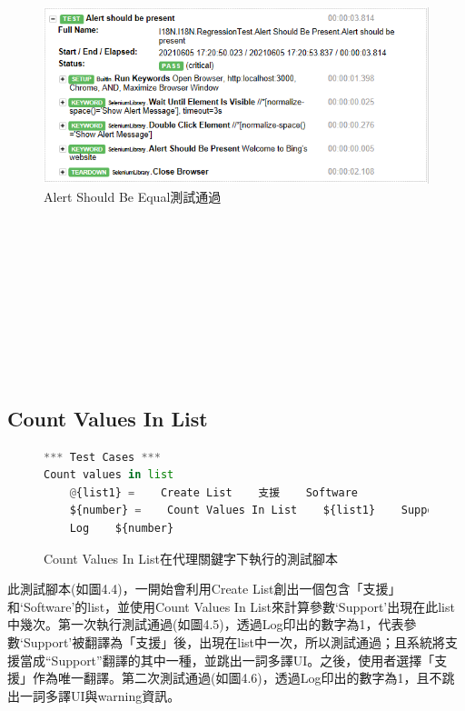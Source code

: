 \begin{figure}[H]
\includegraphics[width= \textwidth]{../論文截圖/4.1.1-3 pass.png}
\caption{Alert Should Be Equal測試通過}
\end{figure}

\hspace*{\fill} \\
\\ \hspace*{\fill} \\
\\ \hspace*{\fill} \\
\\ \hspace*{\fill} \\
\\ \hspace*{\fill} \\
\subsection{Count Values In List}
\begin{figure}[H]
\begin{lstlisting}[language={python}]
*** Test Cases ***
Count values in list
    @{list1} =    Create List    支援    Software
    ${number} =    Count Values In List    ${list1}    Support
    Log    ${number}
\end{lstlisting}
\caption{Count Values In List在代理關鍵字下執行的測試腳本}
\end{figure}
此測試腳本(如圖4.4)，一開始會利用Create List創出一個包含「支援」和‘Software’的list，並使用Count Values In List來計算參數‘Support’出現在此list中幾次。第一次執行測試通過(如圖4.5)，透過Log印出的數字為1，代表參數‘Support’被翻譯為「支援」後，出現在list中一次，所以測試通過；且系統將支援當成“Support”翻譯的其中一種，並跳出一詞多譯UI。之後，使用者選擇「支援」作為唯一翻譯。第二次測試通過(如圖4.6)，透過Log印出的數字為1，且不跳出一詞多譯UI與warning資訊。

